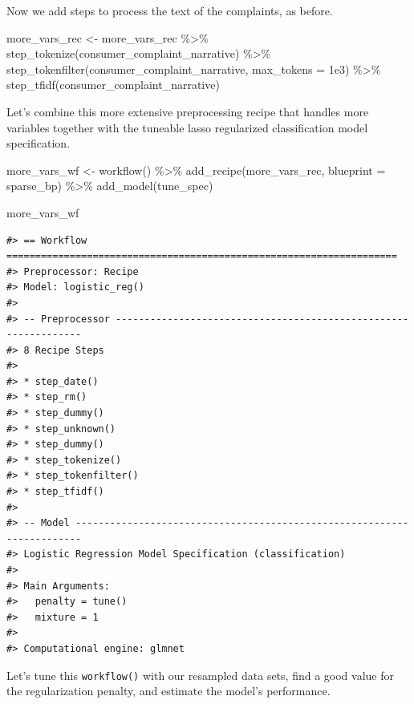 \documentclass[
]{krantz}
\makeatletter
\newenvironment{Shaded}{\begin{snugshade}}{\end{snugshade}}
\newcommand{\AttributeTok}[1]{\textcolor[rgb]{0.77,0.63,0.00}{#1}}
\newcommand{\FloatTok}[1]{\textcolor[rgb]{0.00,0.00,0.81}{#1}}
\newcommand{\FunctionTok}[1]{\textcolor[rgb]{0.00,0.00,0.00}{#1}}
\newcommand{\NormalTok}[1]{#1}
\newcommand{\OtherTok}[1]{\textcolor[rgb]{0.56,0.35,0.01}{#1}}
\newcommand{\SpecialCharTok}[1]{\textcolor[rgb]{0.00,0.00,0.00}{#1}}
\newenvironment{kframe}{%
\medskip{}
\setlength{\fboxsep}{.8em}
 \def\at@end@of@kframe{}%
 \ifinner\ifhmode%
  \def\at@end@of@kframe{\end{minipage}}%
  \begin{minipage}{\columnwidth}%
 \fi\fi%
 \def\FrameCommand##1{\hskip\@totalleftmargin \hskip-\fboxsep
 \colorbox{shadecolor}{##1}\hskip-\fboxsep
     \hskip-\linewidth \hskip-\@totalleftmargin \hskip\columnwidth}%
 \MakeFramed {\advance\hsize-\width
   \@totalleftmargin\z@ \linewidth\hsize
   \@setminipage}}%
 {\par\unskip\endMakeFramed%
 \at@end@of@kframe}
\renewenvironment{Shaded}{\begin{kframe}}{\end{kframe}}
\makeatother
\begin{document}
Now we add steps to process the text of the complaints, as before.

\begin{Shaded}
\begin{Highlighting}[]
\NormalTok{more\_vars\_rec }\OtherTok{\textless{}{-}}\NormalTok{ more\_vars\_rec }\SpecialCharTok{\%\textgreater{}\%}
  \FunctionTok{step\_tokenize}\NormalTok{(consumer\_complaint\_narrative) }\SpecialCharTok{\%\textgreater{}\%}
  \FunctionTok{step\_tokenfilter}\NormalTok{(consumer\_complaint\_narrative, }\AttributeTok{max\_tokens =} \FloatTok{1e3}\NormalTok{) }\SpecialCharTok{\%\textgreater{}\%}
  \FunctionTok{step\_tfidf}\NormalTok{(consumer\_complaint\_narrative)}
\end{Highlighting}
\end{Shaded}

Let's combine this more extensive preprocessing recipe that handles more variables together with the tuneable lasso regularized classification model specification.

\begin{Shaded}
\begin{Highlighting}[]
\NormalTok{more\_vars\_wf }\OtherTok{\textless{}{-}} \FunctionTok{workflow}\NormalTok{() }\SpecialCharTok{\%\textgreater{}\%}
  \FunctionTok{add\_recipe}\NormalTok{(more\_vars\_rec, }\AttributeTok{blueprint =}\NormalTok{ sparse\_bp) }\SpecialCharTok{\%\textgreater{}\%}
  \FunctionTok{add\_model}\NormalTok{(tune\_spec)}

\NormalTok{more\_vars\_wf}
\end{Highlighting}
\end{Shaded}

\begin{verbatim}
#> == Workflow ====================================================================
#> Preprocessor: Recipe
#> Model: logistic_reg()
#> 
#> -- Preprocessor ----------------------------------------------------------------
#> 8 Recipe Steps
#> 
#> * step_date()
#> * step_rm()
#> * step_dummy()
#> * step_unknown()
#> * step_dummy()
#> * step_tokenize()
#> * step_tokenfilter()
#> * step_tfidf()
#> 
#> -- Model -----------------------------------------------------------------------
#> Logistic Regression Model Specification (classification)
#> 
#> Main Arguments:
#>   penalty = tune()
#>   mixture = 1
#> 
#> Computational engine: glmnet
\end{verbatim}

Let's tune this \texttt{workflow()} with our resampled data sets, find a good value for the regularization penalty, and estimate the model's performance.
\end{document}
